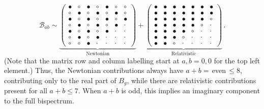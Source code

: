 \begin{equation} \label{eq:bab_newtrelmatrix}
\mathcal{B}_{ab}\sim  \underbrace{ 	
\left( 
\begin {array}{ccccccc}  
\bullet& \circ &\bullet& \circ &\bullet& \circ & \circ \\  
\circ  &\bullet& \circ  &\bullet& \circ &\bullet& \circ \\  
\bullet& \circ &\bullet& \circ &\bullet&  \circ&\bullet\\  
\circ  &\bullet& \circ &\bullet& \circ &\bullet& \cdot \\  
\bullet& \circ &\bullet& \circ &\bullet& \cdot &  \cdot\\  
\circ  &\bullet& \circ &\bullet&  \cdot & \cdot & \cdot \\  
\circ  & \circ &\bullet& \cdot & \cdot & \cdot &  \cdot 
\end {array} 
\right)
}_\text{Newtonian}
+
\underbrace{\left( \begin {array}{ccccccc}   \bullet & \bullet & \bullet & \bullet & \bullet & \bullet & \bullet \\   \bullet & \bullet & \bullet & \bullet & \bullet & \bullet & \bullet \\   \bullet & \bullet & \bullet & \bullet & \bullet & \bullet & \circ  \\   \bullet & \bullet & \bullet & \bullet & \bullet & \circ  & \cdot  \\   \bullet & \bullet & \bullet & \bullet & \circ  & \cdot  & \cdot  \\   \bullet &
 \bullet & \bullet &\circ   & \cdot  & \cdot  & \cdot  \\   \bullet & \bullet & \circ  &\cdot   &  \cdot &  \cdot 
& \cdot  \end {array} \right)}_\text{Relativistic}\,.
\end{equation}
(Note that the matrix row and column labelling start at $a,b=0,0$ for the top left element.) 
Thus, the Newtonian contributions always have $a+b=$\,even\,$\leq8$, contributing only to the real part of $B_g$, while there are relativistic contributions present for all $a+b\leq7$. When $a+b$ is odd, this implies an imaginary component to the full bispectrum.  

